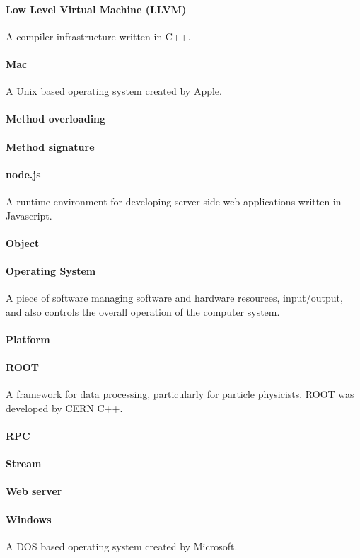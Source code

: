 \paragraph{Low Level Virtual Machine (LLVM)}
A compiler infrastructure written in C++.
\paragraph{Mac}
A Unix based operating system created by Apple.
\paragraph{Method overloading}

\paragraph{Method signature}

\paragraph{node.js}
A runtime environment for developing server-side web applications written in Javascript. 

\paragraph{Object}

\paragraph{Operating System}
A piece of software managing software and hardware resources, input/output, and also controls the overall operation of the computer system.
\paragraph{Platform}

\paragraph{ROOT}
A framework for data processing, particularly for particle physicists. ROOT was developed by CERN C++.


\paragraph{RPC}

\paragraph{Stream}

\paragraph{Web server}

\paragraph{Windows}
A DOS based operating system created by Microsoft.